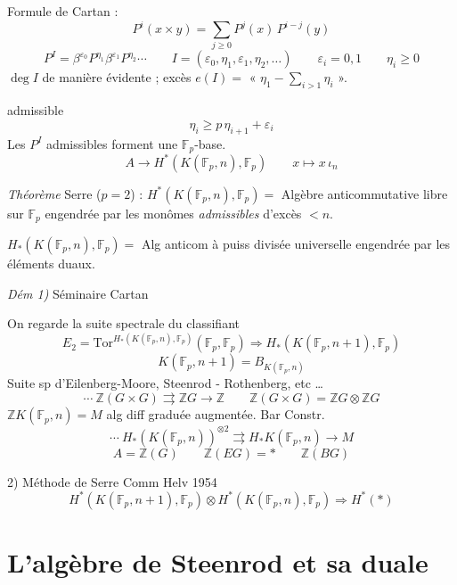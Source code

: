 \documentclass[11pt,a4paper]{article}
\begin{document}
Formule de Cartan :
\[
  P^i(x \times y) = \sum_{j \geq 0} P^j(x)\,P^{i-j}(y)
\]
\[
  P^I = \beta^{\varepsilon_0}P^{\eta_1}\beta^{\varepsilon_1}P^{\eta_2}\cdots
  \qquad I = (\varepsilon_0,\eta_1,\varepsilon_1,\eta_2,\ldots)
  \qquad \varepsilon_i = 0, 1 \qquad \eta_i \geq 0
\]
$\deg I$ de manière évidente ; excès $e(I) = {}$ « $\eta_1 - \sum_{i>1}\eta_i$ ».

admissible
\[
  \eta_i \geq p\,\eta_{i+1} + \varepsilon_i
\]
Les $P^I$ admissibles forment une $\mathbb{F}_p$-base.
\[
  A \longrightarrow H^{\ast}(K(\mathbb{F}_p,n),\mathbb{F}_p)
  \qquad x \mapsto x\,\iota_n
\]

\emph{Théorème} Serre ($p=2$) : $H^{\ast}(K(\mathbb{F}_p,n),\mathbb{F}_p) = {}$ Algèbre anticommutative libre sur $\mathbb{F}_p$ engendrée par les monômes \emph{admissibles} d'excès $<n$.

$H_{\ast}(K(\mathbb{F}_p,n),\mathbb{F}_p) = {}$ Alg anticom à puiss divisée universelle engendrée par les éléments duaux.


\emph{Dém 1)} Séminaire Cartan

On regarde la suite spectrale du classifiant
\[
  E_2 = \mathrm{Tor}^{H_{\ast}(K(\mathbb{F}_p,n),\mathbb{F}_p)}(\mathbb{F}_p,\mathbb{F}_p)
  \Longrightarrow H_{\ast}(K(\mathbb{F}_p,n+1),\mathbb{F}_p)
\]
\[
  K(\mathbb{F}_p,n+1) = B_{K(\mathbb{F}_p,n)}
\]
Suite sp d'Eilenberg-Moore, Steenrod - Rothenberg, etc …
\[
  \cdots\ \mathbb{Z}(G\times G) \rightrightarrows \mathbb{Z}G \longrightarrow \mathbb{Z}
  \qquad \mathbb{Z}(G\times G) = \mathbb{Z}G\otimes\mathbb{Z}G
\]
 \quad
$\mathbb{Z}K(\mathbb{F}_p,n) = M$ \quad alg diff graduée augmentée. Bar Constr.
\[
  \cdots\ H_{\ast}(K(\mathbb{F}_p,n))^{\otimes 2} \rightrightarrows
  H_{\ast}K(\mathbb{F}_p,n) \to M
\]
\[
  A = \mathbb{Z}(G) \qquad \mathbb{Z}(EG) = {\ast} \qquad \mathbb{Z}(BG)
\]

2) Méthode de Serre \quad Comm Helv 1954
\[
  H^{\ast}(K(\mathbb{F}_p,n+1),\mathbb{F}_p)\otimes H^{\ast}(K(\mathbb{F}_p,n),\mathbb{F}_p)
  \Longrightarrow H^{\ast}(\ast)
\]


\section{L'algèbre de Steenrod et sa duale}
\end{document}
